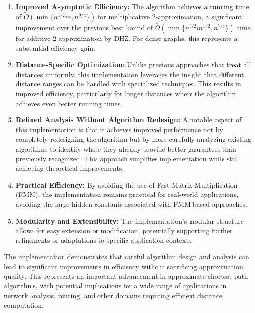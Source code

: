 \documentclass[a4paper,11pt,oneside]{book}
\begin{document}
\begin{enumerate}
    \item \textbf{Improved Asymptotic Efficiency:} The algorithm achieves a running time of $\tilde{O}(\min\{n^{1/2}m, n^{9/4}\})$ for multiplicative 2-approximation, a significant improvement over the previous best bound of $\tilde{O}(\min\{n^{3/2}m^{1/2}, n^{7/3}\})$ time for additive 2-approximation by DHZ. For dense graphs, this represents a substantial efficiency gain.
    
    \item \textbf{Distance-Specific Optimization:} Unlike previous approaches that treat all distances uniformly, this implementation leverages the insight that different distance ranges can be handled with specialized techniques. This results in improved efficiency, particularly for longer distances where the algorithm achieves even better running times.
    
    \item \textbf{Refined Analysis Without Algorithm Redesign:} A notable aspect of this implementation is that it achieves improved performance not by completely redesigning the algorithm but by more carefully analyzing existing algorithms to identify where they already provide better guarantees than previously recognized. This approach simplifies implementation while still achieving theoretical improvements.
    
    \item \textbf{Practical Efficiency:} By avoiding the use of Fast Matrix Multiplication (FMM), the implementation remains practical for real-world applications, avoiding the large hidden constants associated with FMM-based approaches.
    
    \item \textbf{Modularity and Extensibility:} The implementation's modular structure allows for easy extension or modification, potentially supporting further refinements or adaptations to specific application contexts.
\end{enumerate}

The implementation demonstrates that careful algorithm design and analysis can lead to significant improvements in efficiency without sacrificing approximation quality. This represents an important advancement in approximate shortest path algorithms, with potential implications for a wide range of applications in network analysis, routing, and other domains requiring efficient distance computation.\\
\clearpage
\end{document}

